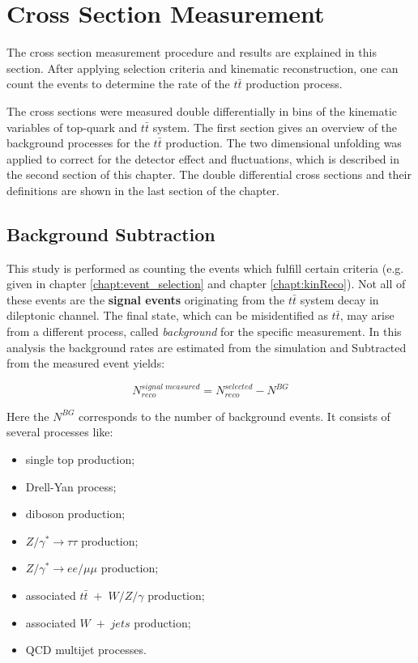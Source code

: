 \chapter{Cross Section Measurement}

The cross section measurement procedure and results are explained in this section.
After applying selection criteria and kinematic reconstruction, one can count the events to determine
the rate of the $t\bar{t}$ production process.

The cross sections were measured double differentially in bins of the kinematic variables of top-quark and $t\bar{t}$ system.
The first section gives an overview of the background processes for the $t\bar{t}$ production.
The two dimensional unfolding was applied to correct for the detector effect and fluctuations, which is described
in the second section of this chapter.
The double differential cross sections and their definitions are shown in the last section of the chapter.

\section{Background Subtraction}
This study is performed as counting the events which fulfill certain criteria (e.g. given in chapter \ref{chapt:event_selection} and 
chapter \ref{chapt:kinReco}). Not all of these events are the \textbf{signal events} originating from the $t\bar{t}$ system decay in dileptonic
channel. The final state, which can be misidentified as $t\bar{t}$, may arise from a different process, called \textit{background}
for the specific measurement. In this analysis the background rates are estimated from the simulation and Subtracted 
from the measured event yields:

\begin{equation}\label{eq:bgsub}
 N^{signal\;measured}_{reco} = N^{selected}_{reco} - N^{BG}
\end{equation}

Here the $N^{BG}$ corresponds to the number of background events. It consists of several processes like:

\begin{itemize}
 \item single top production;
 \item Drell-Yan process;
 \item diboson production;
 \item $Z/\gamma^{*} \rightarrow \tau\tau$ production;
 \item $Z/\gamma^{*} \rightarrow ee/\mu\mu$ production;
 \item associated $t\bar{t}\;+\; W/Z/\gamma$ production;
 \item associated $W\;+\;jets$ production;
 \item QCD multijet processes.
\end{itemize}

